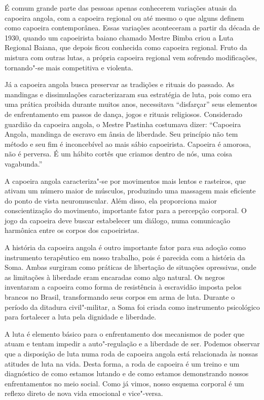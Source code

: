 É comum grande parte das pessoas apenas conhecerem variações atuais da
capoeira angola, com a capoeira regional ou até mesmo o que alguns
definem como capoeira contemporânea. Essas variações aconteceram a
partir da década de 1930, quando um capoeirista baiano chamado Mestre
Bimba criou a Luta Regional Baiana, que depois ficou conhecida como
capoeira regional. Fruto da mistura com outras lutas, a própria capoeira
regional vem sofrendo modificações, tornando"-se mais competitiva e
violenta.

Já a capoeira angola busca preservar as tradições e rituais do passado.
As mandingas e dissimulações caracterizaram sua estratégia de luta, pois
como era uma prática proibida durante muitos anos, necessitava
``disfarçar'' seus elementos de enfrentamento em passos de dança, jogos
e rituais religiosos. Considerado guardião da capoeira angola, o Mestre
Pastinha costumava dizer: ``Capoeira Angola, mandinga de escravo em
ânsia de liberdade. Seu princípio não tem método e seu fim é
inconcebível ao mais sábio capoeirista. Capoeira é amorosa, não é
perversa. É um hábito cortês que criamos dentro de nós, uma coisa
vagabunda.''

A capoeira angola caracteriza"-se por movimentos mais lentos e rasteiros,
que ativam um número maior de músculos, produzindo uma massagem mais
eficiente do ponto de vista neuromuscular. Além disso, ela proporciona
maior conscientização do movimento, importante fator para a percepção
corporal. O jogo da capoeira deve buscar estabelecer um diálogo, numa
comunicação harmônica entre os corpos dos capoeiristas.

A história da capoeira angola é outro importante fator para sua adoção
como instrumento terapêutico em nosso trabalho, pois é parecida com a
história da Soma. Ambas surgiram como práticas de libertação de
situações opressivas, onde as limitações à liberdade eram encaradas como
algo natural. Os negros inventaram a capoeira como forma de resistência
à escravidão imposta pelos brancos no Brasil, transformando seus corpos
em arma de luta. Durante o período da ditadura civil"-militar, a Soma foi
criada como instrumento psicológico para fortalecer a luta pela
dignidade e liberdade.

A luta é elemento básico para o enfrentamento dos mecanismos de poder
que atuam e tentam impedir a auto"-regulação e a liberdade de ser.
Podemos observar que a disposição de luta numa roda de capoeira angola
está relacionada às nossas atitudes de luta na vida. Desta forma, a roda
de capoeira é um treino e um diagnóstico de como estamos lutando e de
como estamos demonstrando nossos enfrentamentos no meio social. Como já
vimos, nosso esquema corporal é um reflexo direto de nova vida emocional
e vice"-versa.

